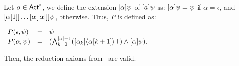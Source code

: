 \begin{proposition}\label{pro:srefaxioms}
Let $\alpha \in {\rm \sf Act}^*$, we define the extension $[\alpha]\psi$ of $[a]\psi$ as: $[\alpha]\psi = \psi$ if $\alpha=\epsilon$, and $[\alpha[1]] \dots [\alpha[|{\alpha}|]] \psi$, otherwise.
Thus, $P$ is defined as: 
\begin{spcenter}
$\begin{array}{lcl}
        P(\epsilon,\psi) & = & \psi \\
        P(\alpha,\psi)  &= &(\bigwedge_{k=0}^{\card{\alpha}-1}(\mlbox{\alpha_k}\mldiam{\alpha[k+1]}\top) \wedge \mlbox{\alpha} \psi). %
    \end{array}$
\end{spcenter}
Then, the reduction axioms from~ are valid.
\end{proposition}

